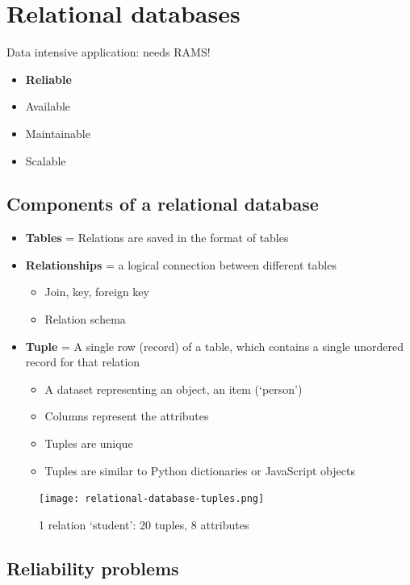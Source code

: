 \documentclass{article}
\begin{document}
\section{Relational databases}

Data intensive application: needs RAMS!

\begin{itemize}
    \item \textbf{Reliable}
    \item Available
    \item Maintainable
    \item Scalable
\end{itemize}

\subsection{Components of a relational database}

\begin{itemize}
    \item \textbf{Tables} = Relations are saved in the format of tables
    \item \textbf{Relationships} = a logical connection between different tables
    \begin{itemize}
        \item Join, key, foreign key
        \item Relation schema
    \end{itemize}
    \item \textbf{Tuple} = A single row (record) of a table, which contains a single unordered record for that relation
    \begin{itemize}
        \item A dataset representing an object, an item (`person')
        \item Columns represent the attributes
        \item Tuples are unique
        \item Tuples are similar to Python dictionaries or JavaScript objects
    \end{itemize}
\end{itemize}

\begin{figure}[H]
    \centering
    \texttt{[image: relational-database-tuples.png]}
    \caption{1 relation `student': 20 tuples, 8 attributes}
\end{figure}

\subsection{Reliability problems}
\end{document}
